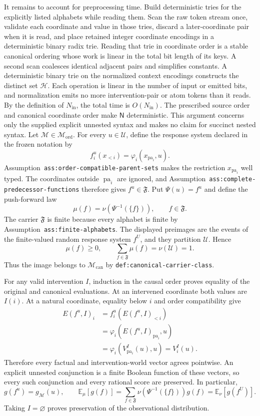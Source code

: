 It remains to account for preprocessing time. Build deterministic tries for the explicitly listed alphabets while reading them. Scan the raw token stream once, validate each coordinate and value in those tries, discard a later-coordinate pair when it is read, and place retained integer coordinate encodings in a deterministic binary radix trie. Reading that trie in coordinate order is a stable canonical ordering whose work is linear in the total bit length of its keys. A second scan coalesces identical adjacent pairs and simplifies constants. A deterministic binary trie on the normalized context encodings constructs the distinct set \(\mathcal H\). Each operation is linear in the number of input or emitted bits, and normalization emits no more intervention-pair or atom tokens than it reads. By the definition of \(N_{\mathrm{in}}\), the total time is \(O(N_{\mathrm{in}})\). The prescribed source order and canonical coordinate order make \(\mathsf N\) deterministic. This argument concerns only the supplied explicit unnested syntax and makes no claim for succinct nested syntax.
Let \(\mathcal M\in\mathcal M_{\mathrm{ord}}\). For every \(u\in\mathcal U\), define the response system declared in the frozen notation by
\[
 f_i^u(x_{<i})=\varphi_i(x_{\operatorname{pa}_i},u).
\]
Assumption~\texttt{ass:order-compatible-parent-sets} makes the restriction \(x_{\operatorname{pa}_i}\) well typed. The coordinates outside \(\operatorname{pa}_i\) are ignored, and Assumption~\texttt{ass:complete-predecessor-functions} therefore gives \(f^u\in\mathfrak F\). Put \(\Psi(u)=f^u\) and define the push-forward law
\[
 \mu(f)=\nu\!\left(\Psi^{-1}(\{f\})\right),
 \qquad f\in\mathfrak F.
\]
The carrier \(\mathfrak F\) is finite because every alphabet is finite by Assumption~\texttt{ass:finite-alphabets}. The displayed preimages are the events of the finite-valued random response system \(f^U\), and they partition \(\mathcal U\). Hence
\[
 \mu(f)\geq0,
 \qquad
 \sum_{f\in\mathfrak F}\mu(f)=\nu(\mathcal U)=1.
\]
Thus the image belongs to \(\mathcal M_{\mathrm{can}}\) by \texttt{def:canonical-carrier-class}.

For any valid intervention \(I\), induction in the causal order proves equality of the original and canonical evaluations. At an intervened coordinate both values are \(I(i)\). At a natural coordinate, equality below \(i\) and order compatibility give
\[
 \begin{aligned}
 E(f^u,I)_i
 &=f_i^u(E(f^u,I)_{<i})\\
 &=\varphi_i(E(f^u,I)_{\operatorname{pa}_i},u)\\
 &=\varphi_i(V^I_{\operatorname{pa}_i}(u),u)
 =V_i^I(u).
 \end{aligned}
\]
Therefore every factual and intervention-world vector agrees pointwise. An explicit unnested conjunction is a finite Boolean function of these vectors, so every such conjunction and every rational score are preserved. In particular,
\[
 g(f^u)=g_{\mathcal M}(u),
 \qquad
 \mathbb E_{\mu}[g(f)]
 =\sum_{f\in\mathfrak F}\nu(\Psi^{-1}(\{f\}))g(f)
 =\mathbb E_{\nu}[g(f^U)].
\]
Taking \(I=\varnothing\) proves preservation of the observational distribution.

